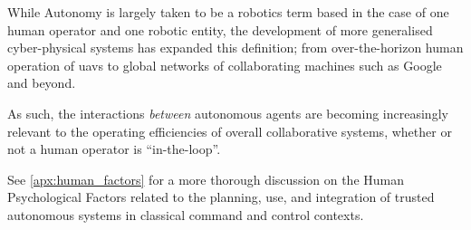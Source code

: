 While Autonomy is largely taken to be a robotics term based in the case of one human operator and one robotic entity, the development of more generalised cyber-physical systems has expanded this definition; from over-the-horizon human operation of \glspl{uav} to global networks of collaborating machines such as Google and beyond.

As such, the interactions \emph{between} autonomous agents are becoming increasingly relevant to the operating efficiencies of overall collaborative systems, whether or not a human operator is ``in-the-loop''.

See \autoref{apx:human_factors} for a more thorough discussion on the Human Psychological Factors related to the planning, use, and integration of trusted autonomous systems in classical command and control contexts.


